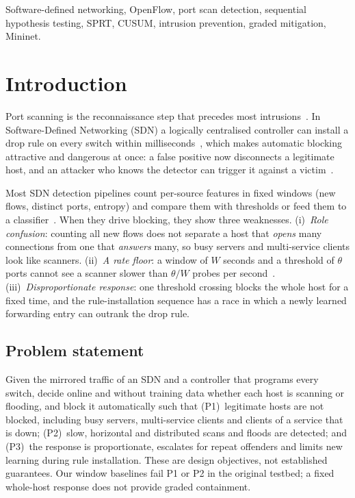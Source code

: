 \documentclass[conference]{IEEEtran}
\begin{document}
\begin{IEEEkeywords}
Software-defined networking, OpenFlow, port scan detection, sequential hypothesis testing, SPRT, CUSUM, intrusion
prevention, graded mitigation, Mininet.
\end{IEEEkeywords}

\section{Introduction}
Port scanning is the reconnaissance step that precedes most intrusions~\cite{bhuyan2014anomaly,pittman2023ml}. In
Software-Defined Networking (SDN) a logically centralised controller can install a drop rule on every switch within
milliseconds~\cite{mckeown2008openflow,kreutz2015sdn}, which makes automatic blocking attractive and dangerous at once: a
false positive now disconnects a legitimate host, and an attacker who knows the detector can trigger it against a
victim~\cite{hong2015poisoning,scotthayward2016survey}.

Most SDN detection pipelines count per-source features in fixed windows (new flows, distinct ports, entropy) and compare
them with thresholds or feed them to a classifier~\cite{braga2010lightweight,giotis2014combining,tang2016deep,belachew2025robust}.
When they drive blocking, they show three weaknesses. (i)~\emph{Role confusion}: counting all new flows does not separate a
host that \emph{opens} many connections from one that \emph{answers} many, so busy servers and multi-service clients look
like scanners. (ii)~\emph{A rate floor}: a window of $W$ seconds and a threshold of $\theta$ ports cannot see a scanner
slower than $\theta/W$ probes per second~\cite{ring2018slow}. (iii)~\emph{Disproportionate response}: one threshold crossing
blocks the whole host for a fixed time, and the rule-installation sequence has a race in which a newly learned forwarding
entry can outrank the drop rule.

\subsection*{Problem statement}
Given the mirrored traffic of an SDN and a controller that programs every switch, decide online and without training data
whether each host is scanning or flooding, and block it automatically such that (P1)~legitimate hosts are not blocked,
including busy servers, multi-service clients and clients of a service that is down; (P2)~slow, horizontal and
distributed scans and floods are detected; and (P3)~the response is proportionate, escalates for repeat offenders and
limits new learning during rule installation. These are design objectives, not established guarantees. Our window
baselines fail P1 or P2 in the original testbed; a fixed whole-host response does not provide graded containment.
\end{document}
